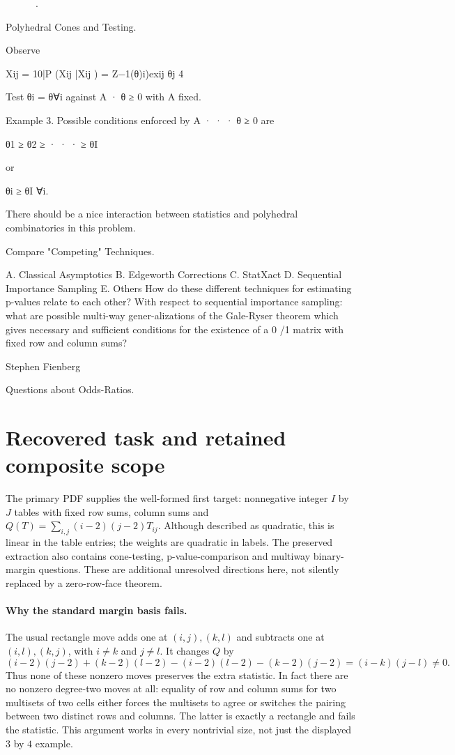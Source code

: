 \documentclass[11pt]{article}
\begin{document}
.

Polyhedral Cones and Testing.

Observe

Xij = {10|P (Xij |Xij ) = Z−1(θ)i)exij θj }4

Test θi = θ∀i against A · θ ≥ 0 with A fixed.

Example 3. Possible conditions enforced by A · · · θ ≥ 0 are

θ1 ≥ θ2 ≥ · · · ≥ θI

or

θi ≥ θI ∀i.

There should be a nice interaction between statistics and polyhedral combinatorics in this problem.

Compare "Competing" Techniques.

A. Classical Asymptotics B. Edgeworth Corrections C. StatXact D. Sequential Importance Sampling E. Others How do these different techniques for estimating p-values relate to each other? With respect to sequential importance sampling: what are possible multi-way gener-alizations of the Gale-Ryser theorem which gives necessary and sufficient conditions for the existence of a 0 /1 matrix with fixed row and column sums?

Stephen Fienberg

Questions about Odds-Ratios.

\section{Recovered task and retained composite scope}
The primary PDF supplies the well-formed first target: nonnegative integer
$I$ by $J$ tables with fixed row sums, column sums and
$Q(T)=\sum_{i,j}(i-2)(j-2)T_{ij}$. Although described as quadratic,
this is linear in the table entries; the weights are quadratic in labels.
The preserved extraction also contains cone-testing, p-value-comparison
and multiway binary-margin questions. These are additional unresolved
directions here, not silently replaced by a zero-row-face theorem.

\paragraph{Why the standard margin basis fails.}
The usual rectangle move adds one at $(i,j),(k,l)$ and subtracts one at
$(i,l),(k,j)$, with $i\ne k$ and $j\ne l$. It changes $Q$ by
\[
(i-2)(j-2)+(k-2)(l-2)-(i-2)(l-2)-(k-2)(j-2)
=(i-k)(j-l)\ne0.
\]
Thus none of these nonzero moves preserves the extra statistic. In fact
there are no nonzero degree-two moves at all: equality of row and column
sums for two multisets of two cells either forces the multisets to agree
or switches the pairing between two distinct rows and columns. The latter
is exactly a rectangle and fails the statistic. This argument works in
every nontrivial size, not just the displayed $3$ by $4$ example.
\end{document}
